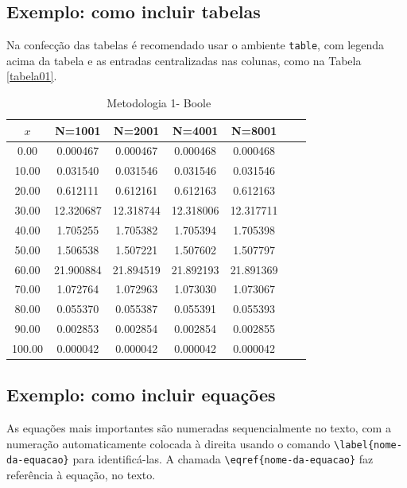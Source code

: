 \subsection{Exemplo: como incluir tabelas}

Na confecção das tabelas é recomendado usar o ambiente \texttt{table}, com legenda acima da tabela e as entradas centralizadas nas colunas, como na Tabela \ref{tabela01}.
\begin{table}[ht] \label{tabela01}
\caption{ \  Metodologia 1- Boole}
\begin{center}
\begin{footnotesize}
\begin{tabular}{ccccccc}
\hline
 $x$  & N=1001  & N=2001  & N=4001  & N=8001
\\ \hline   
0.00  &  0.000467  &  0.000467  &  0.000468    &  0.000468    &  \\ 
10.00  &  0.031540  &  0.031546  &  0.031546    &  0.031546    &  \\
20.00  &  0.612111  &  0.612161  &  0.612163    &  0.612163    & \\ 
30.00  &  12.320687  &  12.318744  &  12.318006    &  12.317711    &  \\ 
40.00  &  1.705255  &  1.705382  &  1.705394    &  1.705398    & \\ 
50.00  &  1.506538  &  1.507221  &  1.507602    &  1.507797    & \\ 
60.00  &  21.900884  &  21.894519  &  21.892193    &  21.891369    &\\ 
70.00  &  1.072764  &  1.072963  &  1.073030    &  1.073067    & \\ 
80.00  &  0.055370  &  0.055387  &  0.055391    &  0.055393    & \\ 
90.00  &  0.002853  &  0.002854  &  0.002854    &  0.002855    & \\ 
100.00  &  0.000042  &  0.000042  &  0.000042    &  0.000042    & \\ 
  \hline
\end{tabular}
\end{footnotesize}
\end{center}
\label{table6P}
\end{table}



\subsection{Exemplo: como incluir equações}

As equações mais importantes são numeradas sequencialmente no texto, com a numeração automaticamente colocada à direita usando o comando \verb!\label{nome-da-equacao}! para identificá-las. A chamada \verb!\eqref{nome-da-equacao}! faz referência à equação, no texto.

